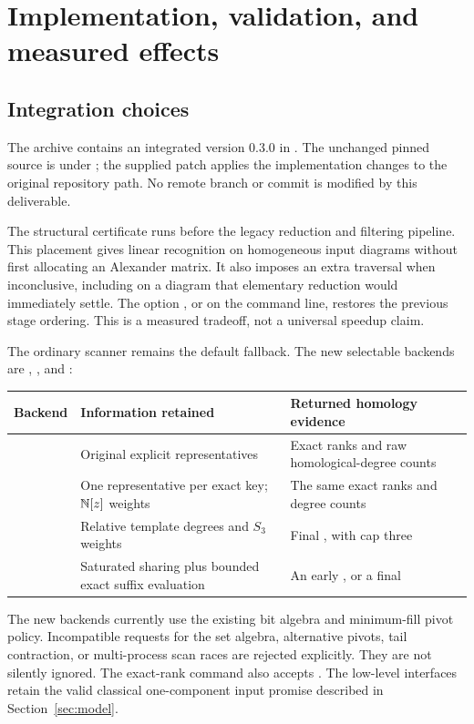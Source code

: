 \section{Implementation, validation, and measured effects}
\label{sec:experiments}

\subsection{Integration choices}
The archive contains an integrated  version 0.3.0 in
. The unchanged pinned source is under ;
the supplied patch applies the implementation changes to the original
repository path. No remote branch or commit is modified by this deliverable.

The structural certificate runs before the legacy reduction and filtering
pipeline. This placement gives linear recognition on homogeneous input
diagrams without first allocating an Alexander matrix. It also imposes an
extra traversal when inconclusive, including on a diagram that elementary
reduction would immediately settle. The option ,
or  on the command line, restores the previous stage
ordering. This is a measured tradeoff, not a universal speedup claim.

The ordinary scanner remains the default fallback. The new selectable
backends are , , and :
\begin{center}\small
\begin{tabularx}{\textwidth}{@{}lYY@{}}
\toprule
Backend & Information retained & Returned homology evidence\\
\midrule
{} & Original explicit representatives & Exact ranks and raw
homological-degree counts\\
 & One representative per exact key; $\mathbb N[z]$ weights & The
same exact ranks and degree counts\\
 & Relative template degrees and $S_3$ weights & Final
, with cap three\\
 & Saturated sharing plus bounded exact suffix evaluation &
An early , or a final
\\
\bottomrule
\end{tabularx}
\end{center}
The new backends currently use the existing bit algebra and minimum-fill
pivot policy. Incompatible requests for the set algebra, alternative pivots,
tail contraction, or multi-process scan races are rejected explicitly.
They are not silently ignored. The exact-rank command also accepts
. The low-level interfaces retain the valid classical
one-component input promise described in Section~\ref{sec:model}.

